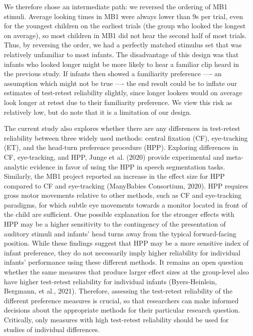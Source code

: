 \documentclass[
  man,floatsintext]{apa6}
\begin{document}
We therefore chose an intermediate path: we reversed the ordering of MB1 stimuli.
Average looking times in MB1 were always lower than 9s per trial, even for the youngest children on the earliest trials (the group who looked the longest on average), so most children in MB1 did not hear the second half of most trials.
Thus, by reversing the order, we had a perfectly matched stimulus set that was relatively unfamiliar to most infants.
The disadvantage of this design was that infants who looked longer might be more likely to hear a familiar clip heard in the previous study.
If infants then showed a familiarity preference ---- an assumption which might not be true ---- the end result could be to inflate our estimates of test-retest reliability slightly, since longer lookers would on average look longer at retest due to their familiarity preference.
We view this risk as relatively low, but do note that it is a limitation of our design.

The current study also explores whether there are any differences in test-retest reliability between three widely used methods: central fixation (CF), eye-tracking (ET), and the head-turn preference procedure (HPP).
Exploring differences in CF, eye-tracking, and HPP, Junge et al. (2020) provide experimental and meta-analytic evidence in favor of using the HPP in speech segmentation tasks.
Similarly, the MB1 project reported an increase in the effect size for HPP compared to CF and eye-tracking (ManyBabies Consortium, 2020).
HPP requires gross motor movements relative to other methods, such as CF and eye-tracking paradigms, for which subtle eye movements towards a monitor located in front of the child are sufficient.
One possible explanation for the stronger effects with HPP may be a higher sensitivity to the contingency of the presentation of auditory stimuli and infants' head turns away from the typical forward-facing position.
While these findings suggest that HPP may be a more sensitive index of infant preference, they do not necessarily imply higher reliability for individual infants' performance using these different methods.
It remains an open question whether the same measures that produce larger effect sizes at the group-level also have higher test-retest reliability for individual infants (Byers-Heinlein, Bergmann, et al., 2021).
Therefore, assessing the test-retest reliability of the different preference measures is crucial, so that researchers can make informed decisions about the appropriate methods for their particular research question.
Critically, only measures with high test-retest reliability should be used for studies of individual differences.
\end{document}
